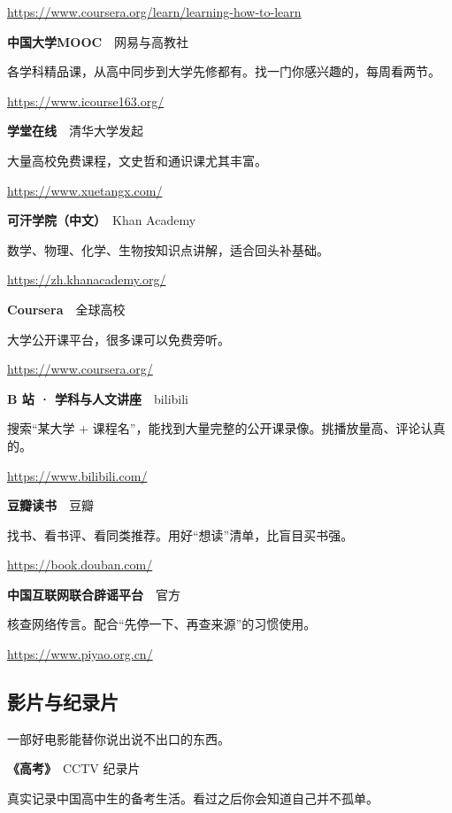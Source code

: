 \documentclass[a4paper,10pt]{article}
\renewcommand{\songti}{\CJKfamily{songpaper}}
\renewcommand{\kaishu}{\songti}
\begin{document}
{\small\url{https://www.coursera.org/learn/learning-how-to-learn}}\par
\vspace{0.25\baselineskip}
\noindent\textbf{中国大学MOOC}　网易与高教社\par
各学科精品课，从高中同步到大学先修都有。找一门你感兴趣的，每周看两节。

{\small\url{https://www.icourse163.org/}}\par
\vspace{0.25\baselineskip}
\noindent\textbf{学堂在线}　清华大学发起\par
大量高校免费课程，文史哲和通识课尤其丰富。

{\small\url{https://www.xuetangx.com/}}\par
\vspace{0.25\baselineskip}
\noindent\textbf{可汗学院（中文）}　Khan Academy\par
数学、物理、化学、生物按知识点讲解，适合回头补基础。

{\small\url{https://zh.khanacademy.org/}}\par
\vspace{0.25\baselineskip}
\noindent\textbf{Coursera}　全球高校\par
大学公开课平台，很多课可以免费旁听。

{\small\url{https://www.coursera.org/}}\par
\vspace{0.25\baselineskip}
\noindent\textbf{B 站 · 学科与人文讲座}　bilibili\par
搜索“某大学 + 课程名”，能找到大量完整的公开课录像。挑播放量高、评论认真的。

{\small\url{https://www.bilibili.com/}}\par
\vspace{0.25\baselineskip}
\noindent\textbf{豆瓣读书}　豆瓣\par
找书、看书评、看同类推荐。用好“想读”清单，比盲目买书强。

{\small\url{https://book.douban.com/}}\par
\vspace{0.25\baselineskip}
\noindent\textbf{中国互联网联合辟谣平台}　官方\par
核查网络传言。配合“先停一下、再查来源”的习惯使用。

{\small\url{https://www.piyao.org.cn/}}\par
\vspace{0.25\baselineskip}
\subsection*{影片与纪录片}
{\kaishu\small 一部好电影能替你说出说不出口的东西。}\par
{}
\noindent\textbf{《高考》}　CCTV 纪录片\par
真实记录中国高中生的备考生活。看过之后你会知道自己并不孤单。
\end{document}
